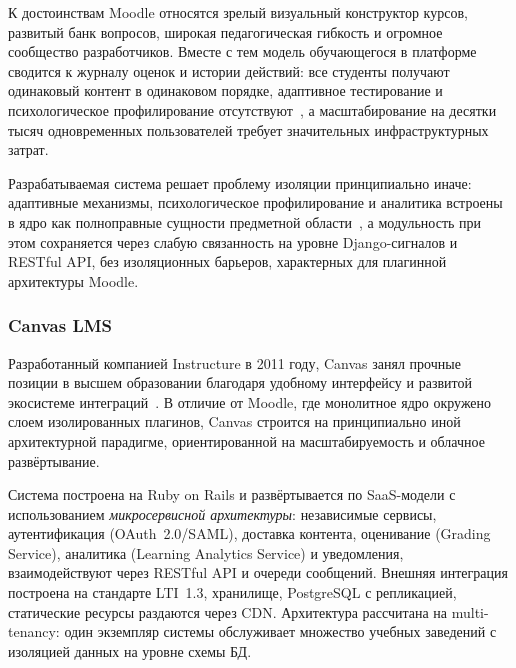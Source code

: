 К достоинствам Moodle относятся зрелый визуальный
конструктор курсов, развитый банк вопросов, широкая
педагогическая гибкость и огромное сообщество разработчиков.
Вместе с тем модель обучающегося в платформе сводится к
журналу оценок и истории действий: все студенты получают
одинаковый контент в одинаковом порядке, адаптивное
тестирование и психологическое профилирование
отсутствуют~\cite{review_elearning_2016}, а масштабирование
на десятки тысяч одновременных пользователей требует
значительных инфраструктурных затрат.

Разрабатываемая система решает проблему изоляции
принципиально иначе: адаптивные механизмы, психологическое
профилирование и аналитика встроены в ядро как полноправные
сущности предметной области~\cite{brusilovsky2007usermodels},
а модульность при этом сохраняется через слабую связанность
на уровне Django-сигналов и RESTful API, без изоляционных
барьеров, характерных для плагинной архитектуры Moodle.

\subsubsection{Canvas LMS}

Разработанный компанией Instructure в 2011 году, Canvas
занял прочные позиции в высшем образовании благодаря
удобному интерфейсу и развитой экосистеме
интеграций~\cite{canvas2026official, review_elearning_2016}.
В отличие от Moodle, где монолитное ядро окружено слоем
изолированных плагинов, Canvas строится на принципиально
иной архитектурной парадигме, ориентированной на
масштабируемость и облачное развёртывание.

Система построена на Ruby on Rails и развёртывается по
SaaS-модели с использованием \textit{микросервисной
архитектуры}: независимые сервисы, аутентификация
(OAuth~2.0/SAML), доставка контента, оценивание (Grading
Service), аналитика (Learning Analytics Service) и
уведомления, взаимодействуют через RESTful API и очереди
сообщений. Внешняя интеграция построена на стандарте
LTI~1.3, хранилище, PostgreSQL с репликацией, статические
ресурсы раздаются через CDN. Архитектура рассчитана на
multi-tenancy: один экземпляр системы обслуживает
множество учебных заведений с изоляцией данных на уровне
схемы БД.

